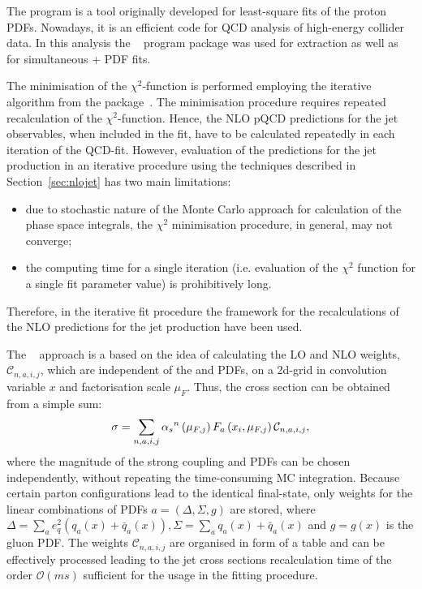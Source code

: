 The \herafitter program is a tool originally developed for least-square fits of the proton PDFs. Nowadays, it is an efficient code for QCD analysis of high-energy collider data. In this analysis the \herafitter~\cite{Aaron:2009aa,Aaron:2009kv} program package was used for \as extraction as well as for simultaneous \as+ PDF fits.

The minimisation of the $\chi^2$-function is performed employing the iterative \migrad algorithm from the \minuit package~\cite{James:1975dr}. The minimisation procedure requires repeated recalculation of the $\chi^2$-function. Hence, the NLO pQCD predictions for the jet observables, when included in the fit, have to be calculated repeatedly in each iteration of the QCD-fit. However, evaluation of the predictions for the jet production in an iterative procedure using the techniques described in Section~\ref{sec:nlojet} has two main limitations: 
\begin{itemize}
 \item due to stochastic nature of the Monte Carlo approach for calculation of the phase space integrals, the $\chi^2$ minimisation procedure,  in general, may not converge;
 \item the computing time for a single iteration (i.e. evaluation of the $\chi^2$ function for a single fit parameter value) is prohibitively long.
\end{itemize}
Therefore, in the iterative fit procedure the \fastnlo framework for the recalculations of the NLO predictions for the jet production have been used. 

The \fastnlo~\cite{thesis:wobisch:2001,Kluge:2006,Wobisch:2011,Britzger:2012} approach is a based on the idea of calculating the LO and NLO weights, $\mathcal{C}_{n,a,i,j}$, which are independent of the \as and PDFs, on a 2d-grid in convolution variable $x$ and factorisation scale $\mu_F$. Thus, the cross section can be obtained from a simple sum:
\begin{equation}
\sigma = \sum_{n,a,i,j}{ \mbox{$\alpha_{s}$}^n\left( \mu_{F,j} \right) F_a\left( x_i, \mu_{F,j}\right)\mathcal{C}_{n,a,i,j} },
\end{equation}
where the magnitude of the strong coupling and PDFs can be chosen independently, without repeating the time-consuming MC integration. Because certain parton configurations lead to the identical final-state, only weights for the linear combinations of PDFs $a=\left( \Delta, \Sigma, g\right) $ are stored, where $\Delta=\sum_a{e_q^2\left(q_a\left(x\right)+\bar{q}_a\left(x\right)\right)}, \Sigma=\sum_a{q_a\left(x\right)+\bar{q}_a\left(x\right)}$ and $g=g\left(x\right)$ is the gluon PDF. The weights $\mathcal{C}_{n,a,i,j}$ are organised in form of a table and can be effectively processed leading to the jet cross sections recalculation time of the order $\mathcal{O}\left( ms\right)$ sufficient for the usage in the fitting procedure.

